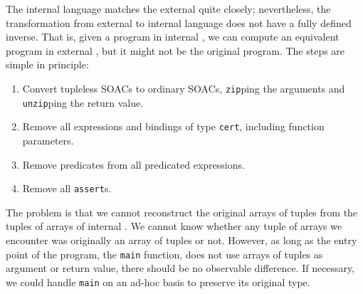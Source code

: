 The internal language matches the external quite closely;
nevertheless, the transformation from external to internal language
does not have a fully defined inverse.  That is, given a program in
internal \LO{}, we can compute an equivalent program in external
\LO{}, but it might not be the original program.  The steps are simple
in principle:

\begin{enumerate}
\item Convert tupleless SOACs to ordinary SOACs, \texttt{zip}ping the
  arguments and \texttt{unzip}ping the return value.

\item Remove all expressions and bindings of type \texttt{cert},
  including function parameters.

\item Remove predicates from all predicated expressions.

\item Remove all \texttt{assert}s.
\end{enumerate}

The problem is that we cannot reconstruct the original arrays of
tuples from the tuples of arrays of internal \LO{}.  We cannot know
whether any tuple of arrays we encounter was originally an array of
tuples or not.  However, as long as the entry point of the program,
the \texttt{main} function, does not use arrays of tuples as argument
or return value, there should be no observable difference.  If
necessary, we could handle \texttt{main} on an ad-hoc basis to
preserve its original type.

